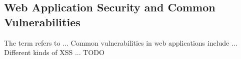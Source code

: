 \subsection{Web Application Security and Common Vulnerabilities}
The term  refers to ... 
Common vulnerabilities in web applications include ... \cite{OWASP/Top10}
Different kinds of XSS ...
{\color{red}TODO}
